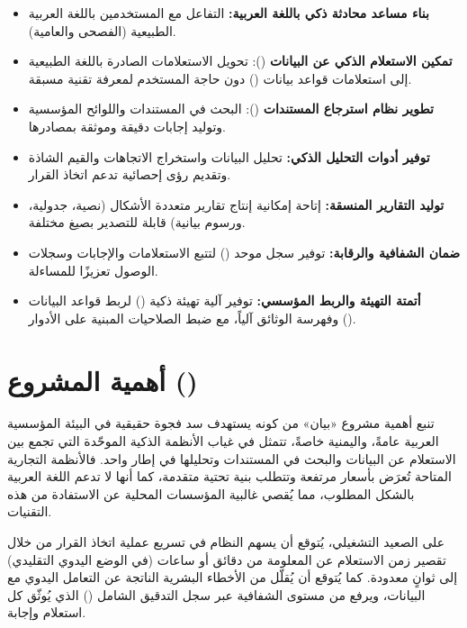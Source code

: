 \begin{itemize}
  \item \textbf{بناء مساعد محادثة ذكي باللغة العربية:} التفاعل مع المستخدمين
        باللغة العربية الطبيعية (الفصحى والعامية).
  \item \textbf{تمكين الاستعلام الذكي عن البيانات} (): تحويل
        الاستعلامات الصادرة باللغة الطبيعية إلى استعلامات قواعد بيانات
        () دون حاجة المستخدم لمعرفة تقنية مسبقة.
  \item \textbf{تطوير نظام استرجاع المستندات} (): البحث في المستندات
        واللوائح المؤسسية وتوليد إجابات دقيقة وموثقة بمصادرها.
  \item \textbf{توفير أدوات التحليل الذكي:} تحليل البيانات واستخراج الاتجاهات
        والقيم الشاذة وتقديم رؤى إحصائية تدعم اتخاذ القرار.
  \item \textbf{توليد التقارير المنسقة:} إتاحة إمكانية إنتاج تقارير متعددة
        الأشكال (نصية، جدولية، ورسوم بيانية) قابلة للتصدير بصيغ مختلفة.
  \item \textbf{ضمان الشفافية والرقابة:} توفير سجل موحد ()
        لتتبع الاستعلامات والإجابات وسجلات الوصول تعزيزًا للمساءلة.
  \item \textbf{أتمتة التهيئة والربط المؤسسي:} توفير آلية تهيئة ذكية
        () لربط قواعد البيانات وفهرسة الوثائق آلياً،
        مع ضبط الصلاحيات المبنية على الأدوار ().
\end{itemize}

\section{أهمية المشروع ()}
\label{sec:significance}

تنبع أهمية مشروع «بيان» من كونه يستهدف سد فجوة حقيقية في البيئة المؤسسية
العربية عامةً، واليمنية خاصةً، تتمثل في غياب الأنظمة الذكية الموحّدة التي تجمع
بين الاستعلام عن البيانات والبحث في المستندات وتحليلها في إطار واحد. فالأنظمة
التجارية المتاحة تُعرَض بأسعار مرتفعة وتتطلب بنية تحتية متقدمة، كما أنها لا
تدعم اللغة العربية بالشكل المطلوب، مما يُقصي غالبية المؤسسات المحلية عن
الاستفادة من هذه التقنيات.

على الصعيد التشغيلي، يُتوقع أن يسهم النظام في تسريع عملية اتخاذ القرار من
خلال تقصير زمن الاستعلام عن المعلومة من دقائق أو ساعات (في الوضع اليدوي
التقليدي) إلى ثوانٍ معدودة. كما يُتوقع أن يُقلّل من الأخطاء البشرية الناتجة عن
التعامل اليدوي مع البيانات، ويرفع من مستوى الشفافية عبر سجل التدقيق الشامل
() الذي يُوثّق كل استعلام وإجابة.

